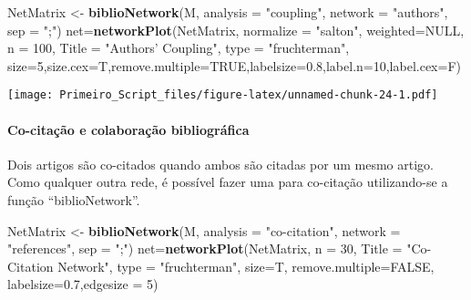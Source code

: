 \documentclass[]{article}
\newenvironment{Shaded}{\begin{snugshade}}{\end{snugshade}}
\newcommand{\DataTypeTok}[1]{\textcolor[rgb]{0.13,0.29,0.53}{#1}}
\newcommand{\DecValTok}[1]{\textcolor[rgb]{0.00,0.00,0.81}{#1}}
\newcommand{\FloatTok}[1]{\textcolor[rgb]{0.00,0.00,0.81}{#1}}
\newcommand{\KeywordTok}[1]{\textcolor[rgb]{0.13,0.29,0.53}{\textbf{#1}}}
\newcommand{\NormalTok}[1]{#1}
\newcommand{\OtherTok}[1]{\textcolor[rgb]{0.56,0.35,0.01}{#1}}
\newcommand{\StringTok}[1]{\textcolor[rgb]{0.31,0.60,0.02}{#1}}
\let\oldparagraph\paragraph
\renewcommand{\paragraph}[1]{\oldparagraph{#1}\mbox{}}
\begin{document}
\begin{Shaded}
\begin{Highlighting}[]
\NormalTok{NetMatrix <-}\StringTok{ }\KeywordTok{biblioNetwork}\NormalTok{(M, }\DataTypeTok{analysis =} \StringTok{"coupling"}\NormalTok{, }\DataTypeTok{network =} \StringTok{"authors"}\NormalTok{, }\DataTypeTok{sep =} \StringTok{";"}\NormalTok{)}
\NormalTok{net=}\KeywordTok{networkPlot}\NormalTok{(NetMatrix,  }\DataTypeTok{normalize =} \StringTok{"salton"}\NormalTok{, }\DataTypeTok{weighted=}\OtherTok{NULL}\NormalTok{, }\DataTypeTok{n =} \DecValTok{100}\NormalTok{, }\DataTypeTok{Title =} \StringTok{"Authors' Coupling"}\NormalTok{, }\DataTypeTok{type =} \StringTok{"fruchterman"}\NormalTok{, }\DataTypeTok{size=}\DecValTok{5}\NormalTok{,}\DataTypeTok{size.cex=}\NormalTok{T,}\DataTypeTok{remove.multiple=}\OtherTok{TRUE}\NormalTok{,}\DataTypeTok{labelsize=}\FloatTok{0.8}\NormalTok{,}\DataTypeTok{label.n=}\DecValTok{10}\NormalTok{,}\DataTypeTok{label.cex=}\NormalTok{F)}
\end{Highlighting}
\end{Shaded}

\texttt{[image: Primeiro\_Script\_files/figure-latex/unnamed-chunk-24-1.pdf]}

\hypertarget{co-citacao-e-colaboracao-bibliografica}{%
\paragraph{Co-citação e colaboração
bibliográfica}\label{co-citacao-e-colaboracao-bibliografica}}

Dois artigos são co-citados quando ambos são citadas por um mesmo
artigo. Como qualquer outra rede, é possível fazer uma para co-citação
utilizando-se a função ``biblioNetwork''.

\begin{Shaded}
\begin{Highlighting}[]
\NormalTok{NetMatrix <-}\StringTok{ }\KeywordTok{biblioNetwork}\NormalTok{(M, }\DataTypeTok{analysis =} \StringTok{"co-citation"}\NormalTok{, }\DataTypeTok{network =} \StringTok{"references"}\NormalTok{, }\DataTypeTok{sep =} \StringTok{";"}\NormalTok{)}
\NormalTok{net=}\KeywordTok{networkPlot}\NormalTok{(NetMatrix, }\DataTypeTok{n =} \DecValTok{30}\NormalTok{, }\DataTypeTok{Title =} \StringTok{"Co-Citation Network"}\NormalTok{, }\DataTypeTok{type =} \StringTok{"fruchterman"}\NormalTok{, }\DataTypeTok{size=}\NormalTok{T, }\DataTypeTok{remove.multiple=}\OtherTok{FALSE}\NormalTok{, }\DataTypeTok{labelsize=}\FloatTok{0.7}\NormalTok{,}\DataTypeTok{edgesize =} \DecValTok{5}\NormalTok{)}
\end{Highlighting}
\end{Shaded}
\end{document}
